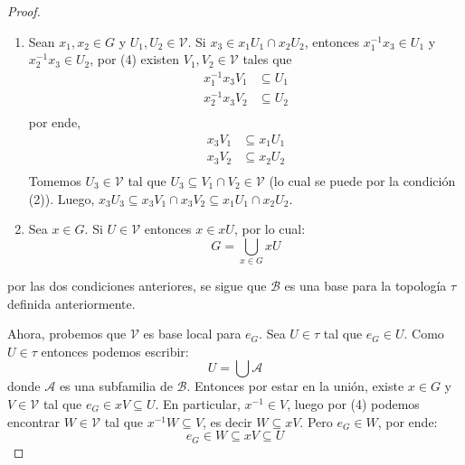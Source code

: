\documentclass[12pt]{report}
\theoremstyle{largebreak}
\begin{document}
\begin{proof}
        \begin{enumerate}
            \item Sean $x_1,x_2\in G$ y $U_1,U_2\in\mathcal{V}$. Si $x_3\in x_1U_1\cap x_2U_2$, entonces $x_1^{-1}x_3\in U_1$ y $x_2^{-1}x_3\in U_2$, por (4) existen $V_1,V_2\in\mathcal{V}$ tales que
            \begin{equation*}
                \begin{split}
                    x_1^{-1}x_3V_1&\subseteq U_1\\
                    x_2^{-1}x_3V_2&\subseteq U_2\\
                \end{split}
            \end{equation*}
            por ende,
            \begin{equation*}
                \begin{split}
                    x_3V_1&\subseteq x_1U_1\\
                    x_3V_2&\subseteq x_2U_2\\
                \end{split}
            \end{equation*}
            Tomemos $U_3\in\mathcal{V}$ tal que $U_3\subseteq V_1\cap V_2\in\mathcal{V}$ (lo cual se puede por la condición (2)). Luego, $x_3U_3\subseteq x_3V_1\cap x_3V_2\subseteq x_1U_1\cap x_2U_2$.

            \item Sea $x\in G$. Si $U\in\mathcal{V}$ entonces $x\in xU$, por lo cual:
            \begin{equation*}
                G=\bigcup_{x\in G}xU
            \end{equation*}
        \end{enumerate}
        por las dos condiciones anteriores, se sigue que $\mathcal{B}$ es una base para la topología $\tau$ definida anteriormente.

        Ahora, probemos que $\mathcal{V}$ es base local para $e_G$. Sea $U\in\tau$ tal que $e_G\in U$. Como $U\in\tau$ entonces podemos escribir:
        \begin{equation*}
            U=\bigcup\mathcal{A}
        \end{equation*}
        donde $\mathcal{A}$ es una subfamilia de $\mathcal{B}$. Entonces por estar en la unión, existe $x\in G$ y $V\in\mathcal{V}$ tal que $e_G\in xV\subseteq U$. En particular, $x^{-1}\in V$, luego por (4) podemos encontrar $W\in\mathcal{V}$ tal que $x^{-1}W\subseteq V$, es decir $W\subseteq xV$. Pero $e_G\in W$, por ende:
        \begin{equation*}
            e_G\in W\subseteq xV\subseteq U
        \end{equation*}
        

\end{proof}
\end{document}
